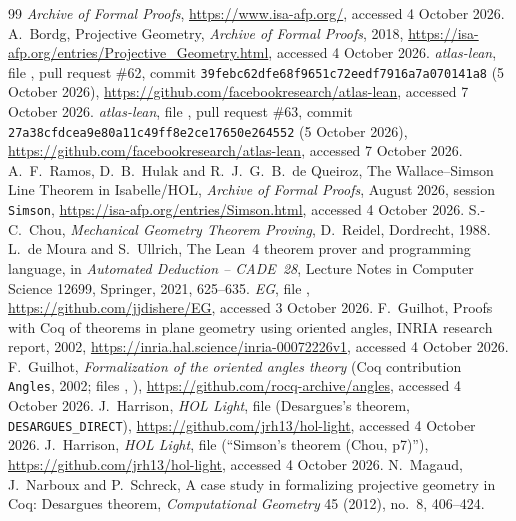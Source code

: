 \documentclass[11pt]{article}
\theoremstyle{definition}
\theoremstyle{remark}
\newcommand{\lean}[1]{\texttt{#1}}
\begin{document}
\begin{thebibliography}{99}\sloppy
{} \emph{Archive of Formal Proofs}, \url{https://www.isa-afp.org/}, accessed 4 October
2026.
 A.~Bordg, Projective Geometry, \emph{Archive of Formal Proofs}, 2018,
\url{https://isa-afp.org/entries/Projective_Geometry.html}, accessed 4 October 2026.
 \emph{atlas-lean}, file
, pull request \#62, commit
\texttt{39febc62dfe68f9651c72eedf7916a7a070141a8} (5 October 2026),
\url{https://github.com/facebookresearch/atlas-lean}, accessed 7 October 2026.
 \emph{atlas-lean}, file
, pull request \#63, commit
\texttt{27a38cfdcea9e80a11c49ff8e2ce17650e264552} (5 October 2026),
\url{https://github.com/facebookresearch/atlas-lean}, accessed 7 October 2026.
 A.~F.~Ramos, D.~B.~Hulak and R.~J.~G.~B.~de Queiroz, The Wallace--Simson Line
Theorem in Isabelle/HOL, \emph{Archive of Formal Proofs}, August 2026, session \texttt{Simson},
\url{https://isa-afp.org/entries/Simson.html}, accessed 4 October 2026.
 S.-C.~Chou, \emph{Mechanical Geometry Theorem Proving}, D.~Reidel, Dordrecht, 1988.
 L.~de Moura and S.~Ullrich, The Lean~4 theorem prover and programming language, in
\emph{Automated Deduction -- CADE~28}, Lecture Notes in Computer Science 12699, Springer, 2021,
625--635.
 \emph{EG}, file ,
\url{https://github.com/jjdishere/EG}, accessed 3 October 2026.
 F.~Guilhot, Proofs with Coq of theorems in plane geometry using oriented angles,
INRIA research report, 2002, \url{https://inria.hal.science/inria-00072226v1}, accessed 4 October
2026.
 F.~Guilhot, \emph{Formalization of the oriented angles theory} (Coq
contribution \texttt{Angles}, 2002; files , ),
\url{https://github.com/rocq-archive/angles}, accessed 4 October 2026.
 J.~Harrison, \emph{HOL Light}, file  (Desargues's
theorem, \lean{DESARGUES\_DIRECT}), \url{https://github.com/jrh13/hol-light}, accessed 4 October
2026.
 J.~Harrison, \emph{HOL Light}, file 
(``Simson's theorem (Chou, p7)''), \url{https://github.com/jrh13/hol-light}, accessed 4 October
2026.
 N.~Magaud, J.~Narboux and P.~Schreck, A case study in formalizing projective
geometry in Coq: Desargues theorem, \emph{Computational Geometry} 45 (2012), no.~8, 406--424.

\end{thebibliography}
\end{document}
